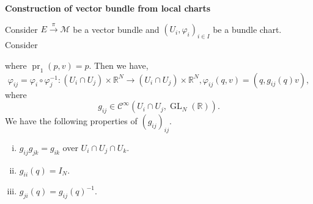 \documentclass[10pt]{article}
\DeclareMathOperator{\pr}{pr}
\DeclareMathOperator{\GL}{GL}
\newcommand{\R}[0]{\mathbb{R}}
\newcommand{\M}[0]{\mathcal{M}}
\newcommand{\cinf}[0]{\mathcal{C}^\infty}
\begin{document}
\textbf{Construction of vector bundle from local charts}
  \par Consider $E\stackrel{\pi}{\to}\M$ be a vector bundle and $(U_i,\varphi_i)_{i\in I}$ be a bundle chart. Consider 
  \begin{center}
  \end{center}
  where $\pr_1(p,v) = p$. Then we have,
  \begin{equation*}
    \varphi_{ij} = \varphi_i\circ\varphi_j^{-1}:(U_i\cap U_j)\times\R^N\to(U_i\cap U_j)\times\R^N, \varphi_{ij}(q,v) = (q,g_{ij}(q)v),
  \end{equation*}
  where 
  \begin{equation*}
    g_{ij}\in\cinf(U_i\cap U_j,\GL_N(\R)).
  \end{equation*}
  We have the following properties of $(g_{ij})_{ij}$.
  \begin{enumerate}[i).]
    \item $g_{ij}g_{jk} = g_{ik}$ over $U_i\cap U_j\cap U_k$.
    \item $g_{ii}(q) = I_N$.
    \item $g_{ji}(q) = g_{ij}(q)^{-1}$.
  \end{enumerate}
\end{document}
